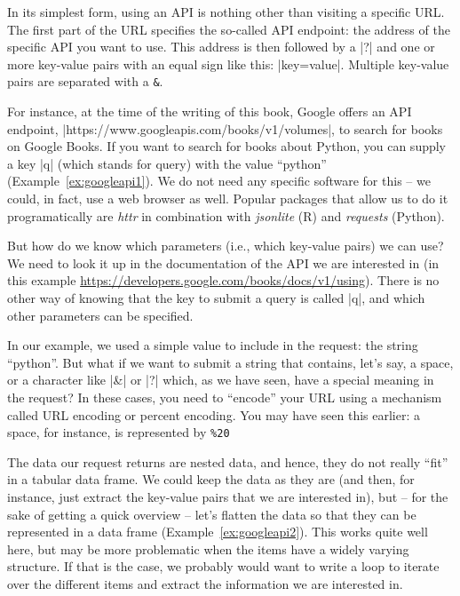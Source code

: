 In its  simplest form, using an API is nothing other than visiting
a specific URL. The first part of the URL specifies the so-called
API endpoint: the address of the specific API you want to use. This
address is then followed by a |?| and one or more key-value pairs with an
equal sign like this: |key=value|. Multiple key-value pairs are
separated with a \texttt{\&}.

For instance, at the time of the writing of this book, Google offers
an API endpoint, |https://www.googleapis.com/books/v1/volumes|, to search for books on Google Books.
If you want to search for books about Python, you can supply a key |q| (which stands for query) with
the value ``python'' (Example~\ref{ex:googleapi1}). We do not need any specific
software for this -- we could, in fact, use a web browser as well.
Popular packages that allow us to do it programatically are \emph{httr}
in combination with \emph{jsonlite} (R) and \emph{requests} (Python).

But how do we know which parameters (i.e., which key-value pairs) we can use?
We need to look it up in the documentation of the API we are
interested in (in this example \url{https://developers.google.com/books/docs/v1/using}).
There is no other way of knowing that the key to submit a query
is called |q|, and which other parameters can be specified.

\begin{feature}
  In our example, we used a simple value to include in the request:
  the string ``python''.  But what if we want to submit a string that
  contains, let's say, a space, or a character like |&| or |?| which,
  as we have seen, have a special meaning in the request? In these
  cases, you need to ``encode'' your URL using a mechanism called URL
  encoding or percent encoding. You may have seen this earlier: a
  space, for instance, is represented by \texttt{\%20}
\end{feature}


The data our request returns are nested data, and hence, they do not
really ``fit'' in a tabular data frame. We could keep the data as they
are (and then, for instance, just extract the key-value pairs that we
are interested in), but -- for the sake of getting a quick overview --
let's flatten the data so that they can be represented in a data frame
(Example~\ref{ex:googleapi2}). This works quite well here, but may be more
problematic when the items have a widely varying structure. If that
is the case, we probably would want to write a loop to iterate
over the different items and extract the information we are interested in.

